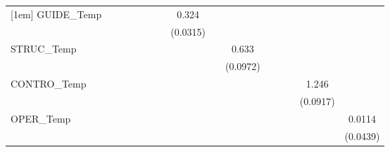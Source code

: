\begin{table}[htbp]
\begin{tabular}{l*{14}{c}}
[1em]
GUIDE\_Temp  &                     &                     &                     &                     &                     &                     &       0.324\sym{***}&                     &                     &                     &                     &                     &                     &                     \\
            &                     &                     &                     &                     &                     &                     &    (0.0315)         &                     &                     &                     &                     &                     &                     &                     \\
[1em]
STRUC\_Temp  &                     &                     &                     &                     &                     &                     &                     &                     &       0.633\sym{***}&                     &                     &                     &                     &                     \\
            &                     &                     &                     &                     &                     &                     &                     &                     &    (0.0972)         &                     &                     &                     &                     &                     \\
[1em]
CONTRO\_Temp &                     &                     &                     &                     &                     &                     &                     &                     &                     &                     &                     &                     &       1.246\sym{***}&                     \\
            &                     &                     &                     &                     &                     &                     &                     &                     &                     &                     &                     &                     &    (0.0917)         &                     \\
[1em]
OPER\_Temp   &                     &                     &                     &                     &                     &                     &                     &                     &                     &                     &                     &                     &                     &      0.0114         \\
            &                     &                     &                     &                     &                     &                     &                     &                     &                     &                     &                     &                     &                     &    (0.0439)         \\

\end{tabular}
\end{table}
